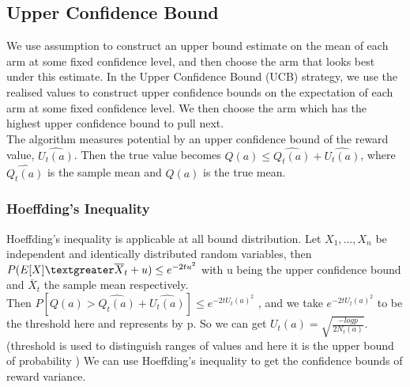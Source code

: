 \subsection{Upper Confidence Bound}
We use assumption to construct an upper bound estimate on the mean of each arm at some fixed confidence level, and then choose the arm that looks best under this estimate. \citep{SVGarbar2012} In the Upper Confidence Bound (UCB) strategy, we use the realised values to construct upper confidence bounds on the expectation of each arm at some fixed confidence level. We then choose the arm which has the highest upper confidence bound to pull next.
\\The algorithm measures potential by an upper confidence bound of the reward value, $\widehat{U_t (a)}$. Then the true value becomes $ Q(a)  \leq \widehat{Q_t (a)}+\widehat{U_t (a)} $, where  $ \widehat{Q_t (a)}$ is the sample mean
and $ Q(a)$ is the true mean.

\subsubsection{Hoeffding’s Inequality}
Hoeffding's inequality is applicable at all bound distribution. Let $X_1, ..., X_n$ be independent and identically distributed random variables, then $ P(E[X]  \textgreater \overline  X_t + u) \leq e^{-2t u^2}$ with u being the upper confidence bound and $ \overline X_t $ the sample mean respectively. \citep{Hoeffding1963}
\\Then $ P[Q(a) >\widehat{Q_t (a)}+\widehat{U_t (a)}] \leq e^{-2t U_t(a)^2}$ , and we take $e^{-2t U_t(a)^2} $ to be the threshold here and represents by p. So we can get $U_t(a) = \sqrt{\frac{-log p}{2N_t (a)}}$.(threshold is used to distinguish ranges of values and here it is the upper bound of probability )
We can use Hoeffding's inequality to get the confidence bounds of reward variance.

